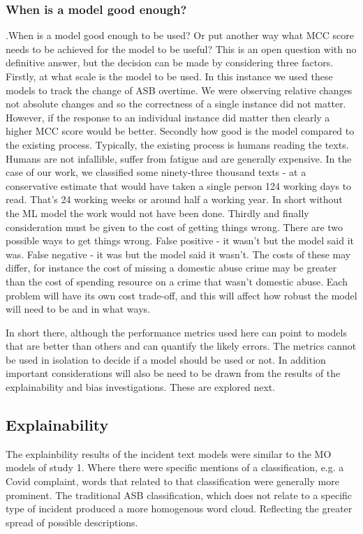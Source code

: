  \subsubsection{When is a model good enough?}  .When is a model good enough to be used? Or put another way what MCC score needs to be achieved for the model to be useful? This is an open question with no definitive answer, but the decision can be made by considering three factors. Firstly, at what scale is the model to be used. In this instance we used these models to track the change of ASB overtime. We were observing relative changes not absolute changes and so the correctness of a single instance did not matter. However, if the response to an individual instance did matter then clearly a higher MCC score would be better. Secondly how good is the model compared to the existing process. Typically, the existing process is humans reading the texts. Humans are not infallible, suffer from fatigue and are generally expensive. In the case of our work, we classified some ninety-three thousand texts - at a conservative estimate that would have taken a single person 124 working days to read. That's 24 working weeks or around half a working year. In short without the ML model the work would not have been done. Thirdly and finally consideration must be given to the cost of getting things wrong. There are two possible ways to get things wrong. False positive - it wasn't but the model said it was. False negative - it was but the model said it wasn't. The costs of these may differ, for instance the cost of missing a domestic abuse crime may be greater than the cost of spending resource on a crime that wasn't domestic abuse. Each problem will have its own cost trade-off, and this will affect how robust the model will need to be and in what ways.
 
 In short there, although the performance metrics used here can point to models that are better than others and can quantify the likely errors. The metrics cannot be used in isolation to decide if a model should be used or not. In addition important considerations will also be need to be drawn from the results of the explainability and bias investigations. These are explored next.


\subsection{Explainability} The explainbility results of the incident text models were similar to the MO models of study 1. Where there were specific mentions of a classification, e.g. a Covid complaint,  words that related to that classification were generally more prominent. The traditional ASB classification, which does not relate to a specific type of incident produced a more homogenous word cloud. Reflecting the greater spread of possible descriptions. 

